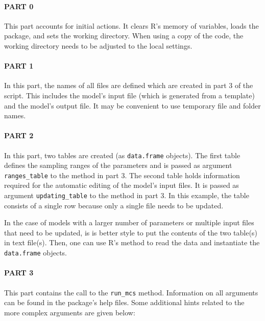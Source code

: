 \paragraph{PART 0} This part accounts for initial actions. It clears R's memory of variables, loads the  package, and sets the working directory. When using a copy of the code, the working directory needs to be adjusted to the local settings.

\paragraph{PART 1} In this part, the names of all files are defined which are created in part 3 of the script. This includes the model's input file (which is generated from a template) and the model's output file. It may be convenient to use temporary file and folder names.

\paragraph{PART 2} In this part, two tables are created (as \texttt{data.frame} objects). The first table defines the sampling ranges of the parameters and is passed as argument \texttt{ranges\_table} to the  method in part 3. The second table holds information required for the automatic editing of the model's input files. It is passed as argument \texttt{updating\_table} to the  method in part 3. In this example, the table consists of a single row because only a single file needs to be updated.

In the case of models with a larger number of parameters or multiple input files that need to be updated, is is better style to put the contents of the two table(s) in text file(s). Then, one can use R's  method to read the data and instantiate the \texttt{data.frame} objects.

\paragraph{PART 3} This part contains the call to the \texttt{run\_mcs} method. Information on all arguments can be found in the  package's help files. Some additional hints related to the more complex arguments are given below:

